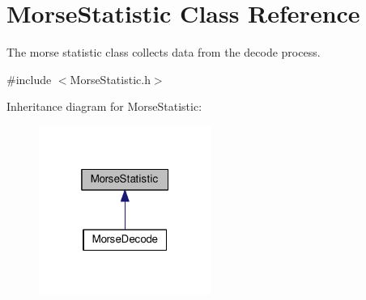 \hypertarget{classMorseStatistic}{}\section{Morse\+Statistic Class Reference}
\label{classMorseStatistic}


The morse statistic class collects data from the decode process.  




{\ttfamily \#include $<$Morse\+Statistic.\+h$>$}



Inheritance diagram for Morse\+Statistic\+:
\nopagebreak
\begin{figure}[H]
\begin{center}
\leavevmode
\includegraphics[width=160pt]{classMorseStatistic__inherit__graph}
\end{center}
\end{figure}
